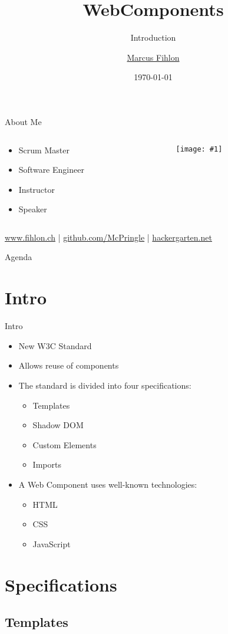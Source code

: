\documentclass{beamer}
\title{WebComponents}
\subtitle{Introduction}
\author{\href{https://www.fihlon.ch/}{Marcus Fihlon}}
\institute[Fihlon]{\href{https://www.fihlon.ch/}{Scrum Master | Software Engineer | Instructor}}
\date{\today}
\newcommand{\myfig}[2]{
	\begin{minipage}[c]{\textwidth}
		\begin{center}
			\texttt{[image: \#1]}
		\end{center}
		\vspace{3mm}
	\end{minipage}
}
\newcommand{\slideItems}[1]{
	\begin{itemize}
		#1
	\end{itemize}
}
\newcommand{\slide}[2]{
	\begin{frame}{#1}
		#2
	\end{frame}
}
\begin{document}
\maketitle
\newlength\someheight

\slide{About Me}{
	\begin{columns}
    	\begin{column}{5cm}
		\slideItems{
			\item Scrum Master
			\item Software Engineer
			\item Instructor
			\item Speaker
		}
    	\end{column}
	    \begin{column}{5cm}
        	\myfig{McPringle}{0.8}
    	\end{column}
	\end{columns}
	\href{https://www.fihlon.ch}{www.fihlon.ch} |
	\href{https://github.com/McPringle}{github.com/McPringle} |
	\href{http://hackergarten.net}{hackergarten.net}
}

\slide{Agenda}{
	\setcounter{tocdepth}{1}
	\tableofcontents
}

\section{Intro}

\slide{Intro}{
	\slideItems{
		\item New W3C Standard
		\item Allows reuse of components
		\item The standard is divided into four specifications:
			\slideItems{
				\item Templates
				\item Shadow DOM
				\item Custom Elements
				\item Imports
			}
		\item A Web Component uses well-known technologies:
			\slideItems{
				\item HTML
				\item CSS
				\item JavaScript
			}
	}
}

\section{Specifications}

\subsection{Templates}
\end{document}
